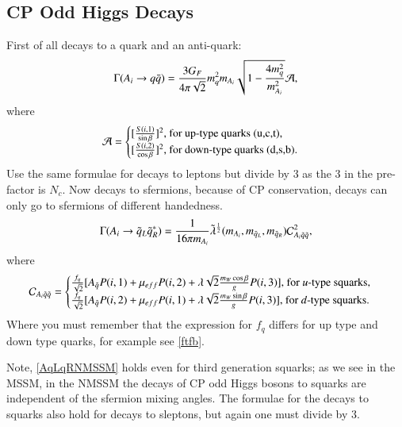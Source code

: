 \documentclass[final,3p,times,pdflatex]{elsarticle}
\begin{document}
\subsection{CP Odd Higgs Decays}

First of all decays to a quark and an anti-quark:
\begin{equation} \label{AqqNMSSM}
\Gamma(A_{i} \rightarrow q \bar{q}) = {3 G_{F} \over 4 \pi \sqrt {2}} m_{q}^2 m_{A_i} \sqrt{1- {4m_{q}^2 \over m_{A_i}^2}} \mathcal{A},
\end{equation}
where 
\begin{equation}
\mathcal{A} = \begin{cases}
				[{S(i,1) \over \sin\beta}]^2 $, for up-type quarks (u,c,t), $ \\
				[{S(i,2) \over \cos\beta}]^2 $, for down-type quarks (d,s,b)$.	\\
				\end{cases}
\end{equation}			
Use the same formulae for decays to leptons but divide by 3 as the 3 in the pre-factor is $N_c$.
Now decays to sfermions, because of CP conservation, decays can only go to sfermions of different handedness.
\begin{equation} \label{AqLqRNMSSM}
\Gamma(A_{i} \rightarrow \tilde{q}_L \tilde{q}_R^*) = {1 \over 16 \pi m_{A_i}} \tilde{\lambda}^{1 \over 2}(m_{A_i}, m_{\tilde{q}_L}, m_{\tilde{q}_R}) \mathcal{C}_{A_{i}\tilde{q}\tilde{q}}^2,
\end{equation}
where 
\begin{equation}
\mathcal{C}_{A_{i}\tilde{q}\tilde{q}} = \begin{cases}
										{f_{q} \over \sqrt{2}} [A_{\tilde{q}} P(i,1) + \mu_{eff}P(i,2) + \lambda \sqrt{2} {m_{W} \cos\beta \over g} P(i,3)] $, for $u$-type squarks,$ \\
										{f_{q} \over \sqrt{2}} [A_{\tilde{q}} P(i,2) + \mu_{eff}P(i,1) + \lambda \sqrt{2} {m_{W} \sin\beta \over g} P(i,3)] $, for $d$-type squarks$. \\
										\end{cases}
\end{equation}
Where you must remember that the expression for $f_{q}$ differs for up type and down type quarks, for example see \eqref{ftfb}.

Note, \eqref{AqLqRNMSSM} holds even for third generation squarks; as we see in the MSSM, in the NMSSM the decays of CP odd Higgs bosons to squarks are independent of the sfermion mixing angles.
The formulae for the decays to squarks also hold for decays to sleptons, but again one must divide by 3.
\end{document}

